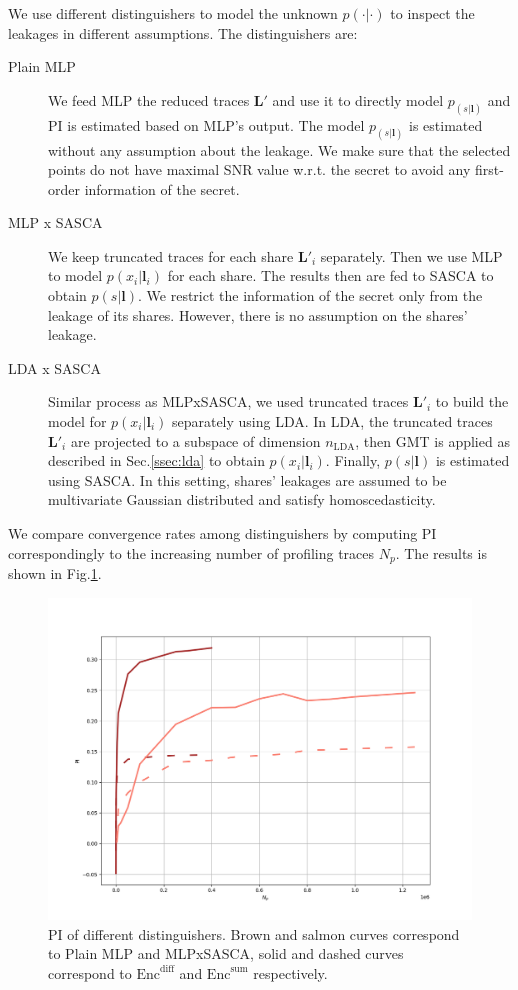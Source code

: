 \documentclass{llncs}
\begin{document}
	We use different distinguishers to model the unknown $p(\cdot|\cdot)$ to inspect the leakages in different assumptions. 
	The distinguishers are:
	\begin{description}
		\item[Plain MLP] We feed MLP the reduced traces $\bm{L}'$ and use it to directly model $p_(s|\bm{l})$ and PI is estimated based on MLP's output. The model $p_(s|\bm{l})$ is estimated without any assumption about the leakage. We make sure that the selected points do not have maximal SNR value w.r.t. the secret to avoid any first-order information of the secret.
		\item[MLP x SASCA] We keep truncated traces for each share $\bm{L}'_i$ separately. Then we use MLP to model $p(x_i|\bm{l}_i)$ for each share. The results then are fed to SASCA to obtain $p(s|\bm{l})$. We restrict the information of the secret only from the leakage of its shares. However, there is no assumption on the shares' leakage.
		\item[LDA x SASCA] Similar process as MLPxSASCA, we used truncated traces $\bm{L}'_i$  to build the model for $p(x_i|\bm{l}_i)$ separately using LDA. In LDA, the truncated traces  $\bm{L}'_i$  are projected to a subspace of dimension $n_{\text{LDA}}$, then GMT is applied as described in Sec.\ref{ssec:lda} to obtain  $p(x_i|\bm{l}_i)$. Finally, $p(s|\bm{l})$ is estimated using SASCA. In this setting, shares' leakages are assumed to be multivariate Gaussian distributed and satisfy homoscedasticity.
	\end{description}
	We compare convergence rates among distinguishers by computing PI correspondingly to the increasing number of profiling traces $N_p$. The results is shown in Fig.\ref{fig:pi}.
	\begin{figure}[h]
		\vspace*{-0.0cm}
		\hspace*{0.0cm}\centering \includegraphics[scale=0.3]{figures/pi_mlps.png}
		\vspace*{0.3cm}
		\caption{PI of different distinguishers. Brown and salmon curves correspond to Plain MLP and MLPxSASCA, solid and dashed curves correspond to $\text{Enc}^{\text{diff}}$ and $\text{Enc}^{\text{sum}}$  respectively.}
		\label{fig:pi}
	\end{figure}
\end{document}

